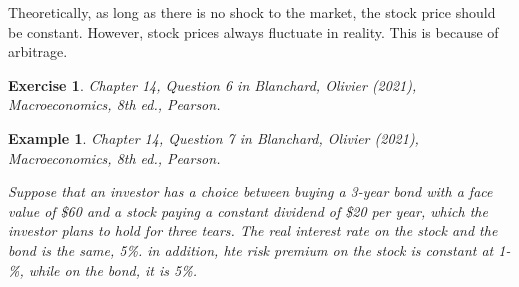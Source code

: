 \documentclass[12pt]{article}
\newtheorem{example}{Example}
\newtheorem{exercise}{Exercise}
\begin{document}
Theoretically, as long as there is no shock to the market, the stock price should be constant. However, stock prices always fluctuate in reality. This is because of arbitrage.

\begin{exercise}
    Chapter 14, Question 6 in Blanchard, Olivier (2021), \textit{Macroeconomics}, 8th ed., Pearson.
\end{exercise}

\begin{example}
    Chapter 14, Question 7 in Blanchard, Olivier (2021), \textit{Macroeconomics}, 8th ed., Pearson.

    Suppose that an investor has a choice between buying a 3-year bond with a face value of \$60 and a stock paying a constant dividend of \$20 per year, which the investor plans to hold for three tears. The real interest rate on the stock and the bond is the same, 5\%. in addition, hte risk premium on the stock is constant at 1-\%, while on the bond, it is 5\%.
\end{example}
\end{document}
